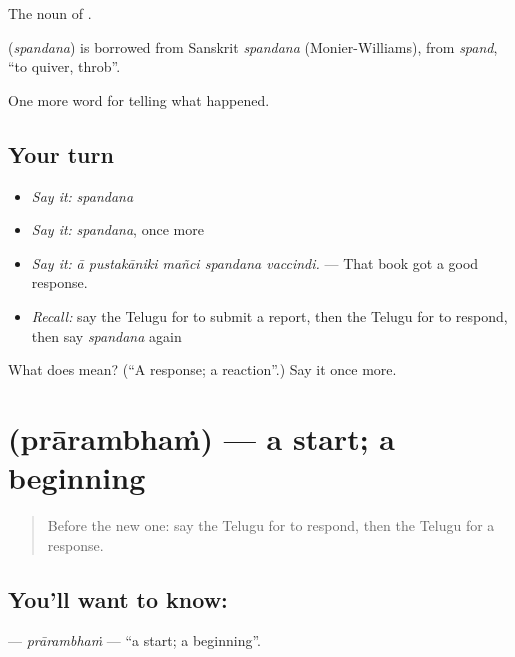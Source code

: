 The noun of .

\begin{cousinweb}
\textbf{} (\emph{spandana}) is borrowed from Sanskrit \emph{spandana} (Monier-Williams), from \emph{spand}, \textquotedblleft{}to quiver, throb\textquotedblright{}.
\end{cousinweb}

\begin{grammarlens}[title={What you've built}]
One more word for telling what happened.
\end{grammarlens}

\subsection*{Your turn}
\begin{itemize}
\raggedright
  \item \emph{Say it:} \emph{spandana}
  \item \emph{Say it:} \emph{spandana}, once more
  \item \emph{Say it:} \emph{ā pustakāniki mañci spandana vaccindi.} — That book got a good response.
  \item \emph{Recall:} say the Telugu for to submit a report, then the Telugu for to respond, then say \emph{spandana} again
\end{itemize}

\begin{tcolorbox}[breakable,colback=teal!4,colframe=teal!35!black,title={Before you move on}]
What does  mean? (\textquotedblleft{}A response; a reaction\textquotedblright{}.) Say it once more.
\end{tcolorbox}
\section[\texorpdfstring{\te{ప్రారంభం} (prārambhaṁ)}{ప్రారంభం (prārambhaṁ)}]{ (prārambhaṁ) — a start; a beginning}

\label{lesson:TE-C376-prarambham}



\begin{quote}
Before the new one: say the Telugu for to respond, then the Telugu for a response.
\end{quote}

\subsection*{You'll want to know: }
\textbf{} — \emph{prārambhaṁ} — \textquotedblleft{}a start; a beginning\textquotedblright{}.

